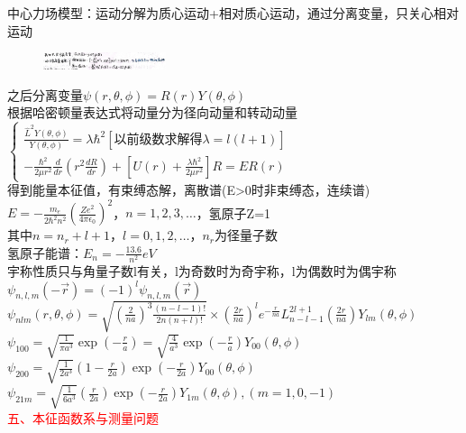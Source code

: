 \documentclass[a4paper,8pt]{extarticle} %
\newcommand{\redtext}[1]{\textcolor{red}{#1}}
\begin{document}
\begin{multicols}{3}
中心力场模型：运动分解为质心运动+相对质心运动，通过分离变量，只关心相对运动\\
\begin{figure}[H]
    \vspace{-0.5cm}
    \centering
    \includegraphics[width=0.32\textwidth]{images/30.png}
    \vspace{-0.6cm}
\end{figure}
之后分离变量$\psi(r,\theta,\phi) = R(r)Y(\theta,\phi)$\\
根据哈密顿量表达式将动量分为径向动量和转动动量\\
$\begin{cases}
    \frac{\hat{L}^2Y(\theta,\phi)}{Y(\theta,\phi)} = \lambda\hbar^2\left[\text{以前级数求解得}\lambda = l(l+1)\right] \\[2ex]
    -\frac{\hbar^2}{2\mu r^2}\frac{d}{dr}\left(r^2\frac{dR}{dr}\right) + \left[U(r) + \frac{\lambda\hbar^2}{2\mu r^2}\right]R = ER(r)
    \end{cases}$\\
得到能量本征值，有束缚态解，离散谱(E>0时非束缚态，连续谱)\\
$E = -\frac{m_e}{2\hbar^2n^2}(\frac{Ze^2}{4\pi\epsilon_0})^2$，$n=1,2,3,\dots$，氢原子Z=1\\
其中$n=n_r+l+1$，$l=0,1,2,\dots$，$n_r$为径量子数\\
氢原子能谱：$E_n = -\frac{13.6}{n^2}eV$\\
宇称性质只与角量子数l有关，l为奇数时为奇宇称，l为偶数时为偶宇称\\
$\psi_{n,l,m}(-\vec{r}) = (-1)^l\psi_{n,l,m}(\vec{r})$\\
$\psi_{nlm}(r,\theta,\phi) = \sqrt{\left(\frac{2}{na}\right)^3 \frac{(n-l-1)!}{2n(n+l)!}} \times \left(\frac{2r}{na}\right)^l e^{-\frac{r}{na}} L_{n-l-1}^{2l+1}\left(\frac{2r}{na}\right)Y_{lm}(\theta,\phi)$\\
$\psi_{100} = \sqrt{\frac{1}{\pi a^3}}\exp\left(-\frac{r}{a}\right) = \sqrt{\frac{4}{a^3}}\exp\left(-\frac{r}{a}\right)Y_{00}(\theta,\phi)$\\
$\psi_{200} = \sqrt{\frac{1}{2a^3}}\left(1-\frac{r}{2a}\right)\exp\left(-\frac{r}{2a}\right)Y_{00}(\theta,\phi)$\\
$\psi_{21m} = \sqrt{\frac{1}{6a^3}}\left(\frac{r}{2a}\right)\exp\left(-\frac{r}{2a}\right)Y_{1m}(\theta,\phi),(m=1,0,-1)$\\
\redtext{五、本征函数系与测量问题}


\end{multicols}
\end{document}
